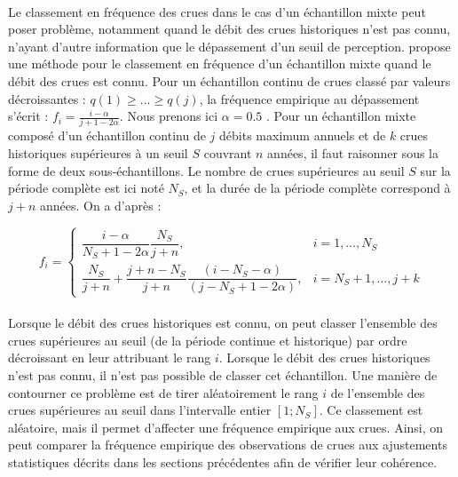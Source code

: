 \documentclass[11pt]{article}
\begin{document}
		\paragraph{} Le classement en fréquence des crues dans le cas d'un échantillon mixte peut poser problème, notamment quand le débit des crues historiques n'est pas connu, n'ayant d'autre information que le dépassement d'un seuil de perception. \citet{hirsch_probability_1987} propose une méthode pour le classement en fréquence d'un échantillon mixte quand le débit des crues est connu. Pour un échantillon continu de crues classé par valeurs décroissantes : $q(1) \geq ... \geq q(j)$, la fréquence empirique au dépassement s'écrit : $f_i = \frac{i-\alpha}{j+1-2\alpha}$. Nous prenons ici $\alpha = 0.5$ \citep{hazen_storage_1914}. Pour un échantillon mixte composé d'un échantillon continu de $j$ débits maximum annuels et de $k$ crues historiques supérieures à un seuil $S$ couvrant $n$ années, il faut raisonner sous la forme de deux sous-échantillons. Le nombre de crues supérieures au seuil $S$ sur la période complète est ici noté $N_S$, et la durée de la période complète correspond à $j + n$ années. On a d'après \citet{hirsch_probability_1987} :
		
		\begin{equation}	
		f_i = \begin{cases}\dfrac{i-\alpha}{N_S+1-2 \alpha} \dfrac{N_S}{j+n}, & i=1, \ldots, N_S \\ \dfrac{N_S}{j+n}+\dfrac{j+n-N_S}{j+n} \dfrac{(i-N_S-\alpha)}{(j-N_S+1-2\alpha)}, & i=N_S+1, \ldots, j+k\end{cases}
		\label{eq:FreqHisto}	
		\end{equation}
%	
%		
	
	\paragraph{} Lorsque le débit des crues historiques est connu, on peut classer l'ensemble des crues supérieures au seuil (de la période continue et historique) par ordre décroissant en leur attribuant le rang $i$. Lorsque le débit des crues historiques n'est pas connu, il n'est pas possible de classer cet échantillon. Une manière de contourner ce problème est de tirer aléatoirement le rang $i$ de l'ensemble des crues supérieures au seuil dans l'intervalle entier $\left[1;N_S\right]$. Ce classement est aléatoire, mais il permet d'affecter une fréquence empirique aux crues. Ainsi, on peut comparer la fréquence empirique des observations de crues aux ajustements statistiques décrits dans les sections précédentes afin de vérifier leur cohérence. 
		
\end{document}
